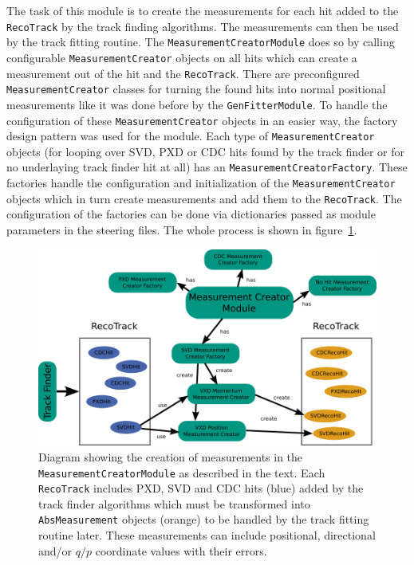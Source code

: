 The task of this module is to create the measurements for each hit added to the \texttt{RecoTrack} by the track finding algorithms. The measurements can then be used by the track fitting routine. The \texttt{MeasurementCreatorModule} does so by calling configurable \texttt{MeasurementCreator} objects on all hits which can create a measurement out of the hit and the \texttt{RecoTrack}. There are preconfigured \texttt{MeasurementCreator} classes for turning the found hits into normal positional measurements like it was done before by the \texttt{GenFitterModule}. To handle the configuration of these \texttt{MeasurementCreator} objects in an easier way, the factory design pattern was used for the module. Each type of \texttt{MeasurementCreator} objects (for looping over SVD, PXD or CDC hits found by the track finder or for no underlaying track finder hit at all) has an \texttt{MeasurementCreatorFactory}. These factories handle the configuration and initialization of the \texttt{MeasurementCreator} objects which in turn create measurements and add them to the \texttt{RecoTrack}. The configuration of the factories can be done via dictionaries passed as module parameters in the steering files. The whole process is shown in figure~\ref{fig-measurement-creator}.

\begin{figure}
  \centering
  \includegraphics[width=\linewidth]{figures/vxd/measurementCreator.pdf}
  \caption[Diagram showing the creation of measurements.]{Diagram showing the creation of measurements in the \texttt{MeasurementCreatorModule} as described in the text. Each \texttt{RecoTrack} includes PXD, SVD and CDC hits (blue) added by the track finder algorithms which must be transformed into \texttt{AbsMeasurement} objects (orange) to be handled by the track fitting routine later. These measurements can include positional, directional and/or $q/p$ coordinate values with their errors.}
  \label{fig-measurement-creator}
\end{figure}

